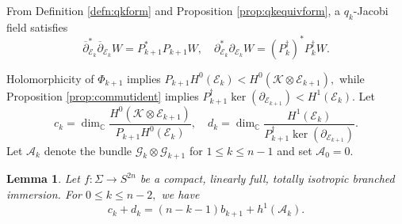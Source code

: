 \documentclass[11pt]{article}
\newtheorem{lemma}[theorem]{Lemma}
\theoremstyle{definition}
\newcommand{\C}{\mathbb{C}}
\newcommand{\del}{\partial}
\newcommand{\delbar}{\overline{\partial}}
\numberwithin{equation}{section}
\begin{document}
From Definition \ref{defn:qkform} and Proposition \ref{prop:qkequivform}, a $q_k$-Jacobi field satisfies
\begin{equation}\label{eq:qkJacobiidentities}
    \delbar^*_{\mathcal{E}_k} \delbar_{\mathcal{E}_k} W = P_{k+1}^* P_{k+1} W, \quad \del^*_{\mathcal{E}_k} \del_{\mathcal{E}_k} W = (P_k^\dagger)^* P^\dagger_k W.
\end{equation}

Holomorphicity of $\Phi_{k+1}$ implies $P_{k+1} H^0(\mathcal{E}_k) < H^0(\mathcal{K} \otimes \mathcal{E}_{k+1}),$ while Proposition \ref{prop:commutident} implies $P^\dagger_{k+1} \ker(\del_{\mathcal{E}_{k+1}}) < H^1(\mathcal{E}_{k}).$ Let
\begin{equation}
    c_k = \dim_\C \frac{H^0(\mathcal{K} \otimes \mathcal{E}_{k+1})}{P_{k+1} H^0(\mathcal{E}_k)}, \quad d_k = \dim_\C \frac{H^1(\mathcal{E}_{k})}{P^\dagger_{k+1} \ker(\del_{\mathcal{E}_{k+1}})}.
\end{equation}
Let $\mathcal{A}_k$ denote the bundle $\mathcal{G}_k \otimes \mathcal{G}_{k+1}$ for $1 \leq k \leq n-1$ and set $\mathcal{A}_0 = 0.$

\begin{lemma}\label{lem:ckdkcalc}
    Let $f: \Sigma \to S^{2n}$ be a compact, linearly full, totally isotropic branched immersion. For $0 \leq k \leq n-2,$ we have
    \begin{equation*}
        c_k + d_k = (n-k-1)b_{k+1} + h^1(\mathcal{A}_k).
    \end{equation*}
\end{lemma}
\end{document}
